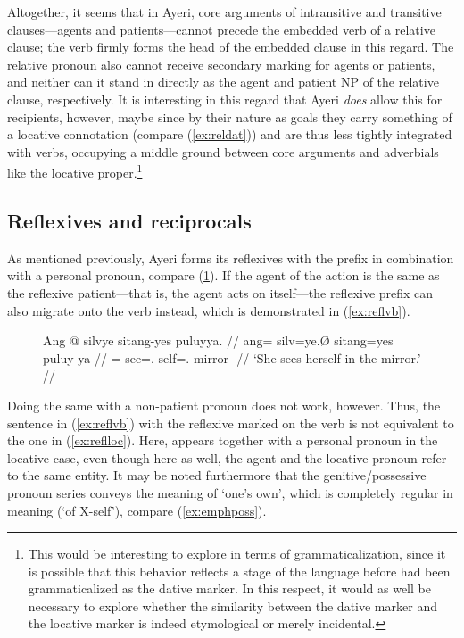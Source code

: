 Altogether, it seems that in Ayeri, core arguments of intransitive and
transitive clauses---agents and patients---cannot precede the embedded verb of
a relative clause; the verb firmly forms the head of the embedded clause in
this regard. The relative pronoun also cannot receive secondary marking for
agents or patients, and neither can it stand in directly as the agent and
patient NP of the relative clause, respectively. It is interesting in this
regard that Ayeri \emph{does} allow this for recipients, however, maybe since
by their nature as goals they carry something of a locative connotation
(compare (\ref{ex:reldat})) and are thus less tightly integrated with verbs,
occupying a middle ground between core arguments and adverbials like the
locative proper.\footnote{This would be interesting to explore in terms of
grammaticalization, since it is possible that this behavior reflects a stage of
the language before  had been grammaticalized as the dative
marker. In this respect, it would as well be necessary to explore whether the
similarity between the dative marker  and the locative marker
 is indeed etymological or merely incidental.}


\subsection{Reflexives and reciprocals}
\label{subsec:reflrec}

As mentioned previously, Ayeri forms its reflexives with the prefix 
 in combination with a personal pronoun, compare 
(\ref{ex:reflpat}). If the agent of the action is the same as the reflexive 
patient---that is, the agent acts on itself---the reflexive prefix can also 
migrate onto the verb instead, which is demonstrated in (\ref{ex:reflvb}).

\begin{figure}
\ex\label{ex:reflpat}\begingl
	\gla Ang @ silvye sitang-yes puluyya. //
	\glb ang= silv=ye.Ø sitang=yes puluy-ya //
	\glc \AgtT{}= see=\TsgF{}.\Top{} self=\TsgF{}.\Parg{} mirror-\Loc{} //
	\glft `She sees herself in the mirror.' //
\endgl\xe
\end{figure}

Doing the same with a non-patient pronoun does not work, however. Thus, the
sentence in (\ref{ex:reflvb}) with the reflexive  marked
on the verb is not equivalent to the one in (\ref{ex:reflloc}). Here,
 appears together with a personal pronoun in the locative
case, even though here as well, the agent and the locative pronoun refer to the
same entity. It may be noted furthermore that the genitive/possessive pronoun
series conveys the meaning of `one's own', which is completely regular in
meaning (`of X-self'), compare (\ref{ex:emphposs}).


